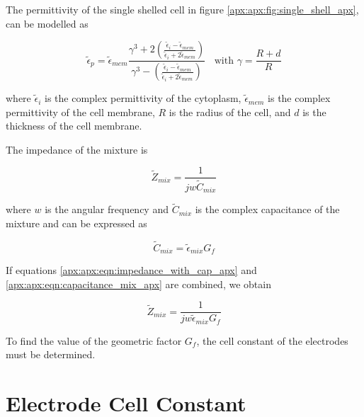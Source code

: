   \par The permittivity of the single shelled cell in figure \ref{apx:apx:fig:single_shell_apx}, can be modelled as
  
  \begin{equation}
      \tilde{\epsilon}_p = \tilde{\epsilon}_{mem} 
      \frac{\gamma^3+2(\frac{\tilde{\epsilon}_i - \tilde{\epsilon}_{mem}}
      {\tilde{\epsilon}_i + 2\tilde{\epsilon}_{mem}})}{\gamma^3 - (\frac{\tilde{\epsilon}_i - \tilde{\epsilon}_{mem}}{\tilde{\epsilon}_i + 2\tilde{\epsilon}_{mem}})} \;\;\text{  with } 
      \gamma = \frac{R + d}{R} 
  \end{equation}
  
  \noindent where $\tilde{\epsilon}_i$ is the complex permittivity of the cytoplasm, $\tilde{\epsilon}_{mem}$ is the complex permittivity of the cell membrane, $R$ is the radius of the cell, and $d$ is the thickness of the cell membrane.

  
  The impedance of the mixture is
  
  \begin{equation}
    \tilde{Z}_{mix} = \frac{1}{jw\tilde{C}_{mix}}
    \label{apx:apx:eqn:impedance_with_cap_apx}
  \end{equation}
  
  \noindent where $w$ is the angular frequency and $\tilde{C}_{mix}$ is the complex capacitance of the mixture and can be expressed as
  
  \begin{equation}
      \tilde{C}_{mix} = \tilde{\epsilon}_{mix} G_f
      \label{apx:apx:eqn:capacitance_mix_apx}
  \end{equation}
  
  \noindent If equations \ref{apx:apx:eqn:impedance_with_cap_apx} and \ref{apx:apx:eqn:capacitance_mix_apx} are combined, we obtain
  
  \begin{equation}
    \tilde{Z}_{mix} = \frac{1}{jw\tilde{\epsilon}_{mix}G_f}
    \label{apx:apx:eqn:impedance_with_Gf_apx}
  \end{equation}
  
  \par To find the value of the geometric factor $G_f$, the cell constant of the electrodes must be determined.
  
  
  \section{Electrode Cell Constant}
  
